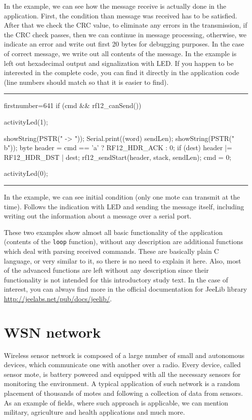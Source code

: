 \documentclass[12pt,titlepage]{article}
\newcommand{\codetitle}[1]{\bigskip \noindent {\scriptsize #1}\hrule}
\begin{document}
        In the example, we can see how the message receive is actually done in the application. First, the condition than message was received has to be satisfied. After that we check the CRC value, to eliminate any errors in the transmission, if the CRC check passes, then we can continue in message processing, otherwise, we indicate an error and write out first 20 bytes for debugging purposes. In the case of correct message, we write out all contents of the message. In the example is left out hexadecimal output and signalization with LED. If you happen to be interested in the complete code, you can find it directly in the application code (line numbers should match so that it is easier to find).

        \newpage
        \codetitle{Simplified example of message send in RF12demo}
        \begin{cppcode*}{firstnumber=641}
        if (cmd && rf12_canSend()) {
            activityLed(1);

            showString(PSTR(" -> "));
            Serial.print((word) sendLen);
            showString(PSTR(" b\n"));
            byte header = cmd == 'a' ? RF12_HDR_ACK : 0;
            if (dest)
                header |= RF12_HDR_DST | dest;
            rf12_sendStart(header, stack, sendLen);
            cmd = 0;

            activityLed(0);
        }
      \end{cppcode*}
      \hrule
      \bigskip

        In the example, we can see initial condition (only one mote can transmit at the time). Follows the indication with LED and sending the message itself, including writing out the information about a message over a serial port.

        These two examples show almost all basic functionality of the application (contents of the \texttt{loop} function), without any description are additional functions which deal with parsing received commands. These are basically plain C language, or very similar to it, so there is no need to explain it here. Also, most of the advanced functions are left without any description since their functionality is not intended for this introductory study text. In the case of interest, you can always find more in the official documentation for JeeLib library \url{http://jeelabs.net/pub/docs/jeelib/}.

        \section{WSN network}
          Wireless sensor network is composed of a large number of small and autonomous devices, which communicate one with another over a radio. Every device, called sensor mote, is battery powered and equipped with all the necessary sensors for monitoring the environment. A typical application of such network is a random placement of thousands of motes and following a collection of data from sensors. As an example of fields, where such approach is applicable, we can mention military, agriculture and health applications and much more.
\end{document}
